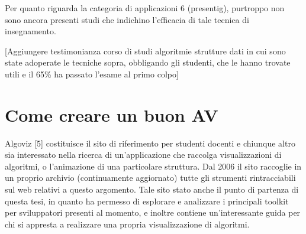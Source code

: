 Per quanto riguarda la categoria di applicazioni 6 (presentig), purtroppo
non sono ancora presenti studi che indichino l'efficacia di tale tecnica
di insegnamento.

{[}Aggiungere testimonianza corso di studi algoritmie strutture dati
in cui sono state adoperate le tecniche sopra, obbligando gli studenti,
che le hanno trovate utili e il 65\% ha passato l'esame al primo colpo{]}


\section{Come creare un buon AV}

Algoviz {[}5{]} costituisce il sito di riferimento per studenti docenti
e chiunque altro sia interessato nella ricerca di un'applicazione
che raccolga visualizzazioni di algoritmi, o l'animazione di una particolare
struttura. Dal 2006 il sito raccoglie in un proprio archivio (continuamente
aggiornato) tutte gli strumenti rintracciabili sul web relativi a
questo argomento. Tale sito  stato anche il punto di partenza di
questa tesi, in quanto ha permesso di esplorare e analizzare i principali
toolkit per sviluppatori presenti al momento, e inoltre contiene un'interessante
guida per chi si appresta a realizzare una propria visualizzazione
di algoritmi. 

